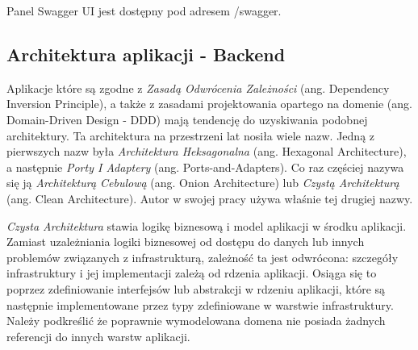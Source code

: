 \documentclass[12pt]{article}
\numberwithin{figure}{section}
\begin{document}
    Panel Swagger UI jest dostępny pod adresem /swagger.

    \subsection{Architektura aplikacji - Backend}
    
    
    Aplikacje które są zgodne z \textit{Zasadą Odwrócenia Zależności} (ang. Dependency Inversion Principle), a także z zasadami projektowania opartego na domenie (ang. Domain-Driven Design - DDD) mają tendencję do uzyskiwania podobnej architektury. Ta architektura na przestrzeni lat nosiła wiele nazw. Jedną z pierwszych nazw była \textit{Architektura Heksagonalna} (ang. Hexagonal Architecture), a następnie \textit{Porty I Adaptery} (ang. Ports-and-Adapters). Co raz częściej nazywa się ją \textit{Architekturą Cebulową} (ang. Onion Architecture) lub \textit{Czystą Architekturą} (ang. Clean Architecture). Autor w swojej pracy używa właśnie tej drugiej nazwy.
    
    \textit{Czysta Architektura} stawia logikę biznesową i model aplikacji w środku aplikacji. Zamiast uzależniania logiki biznesowej od dostępu do danych lub innych problemów związanych z infrastrukturą, zależność ta jest odwrócona: szczegóły infrastruktury i jej implementacji zależą od rdzenia aplikacji. Osiąga się to poprzez zdefiniowanie interfejsów lub abstrakcji w rdzeniu aplikacji, które są następnie implementowane przez typy zdefiniowane w warstwie infrastruktury. Należy podkreślić że poprawnie wymodelowana domena nie posiada żadnych referencji do innych warstw aplikacji.
    
\end{document}
